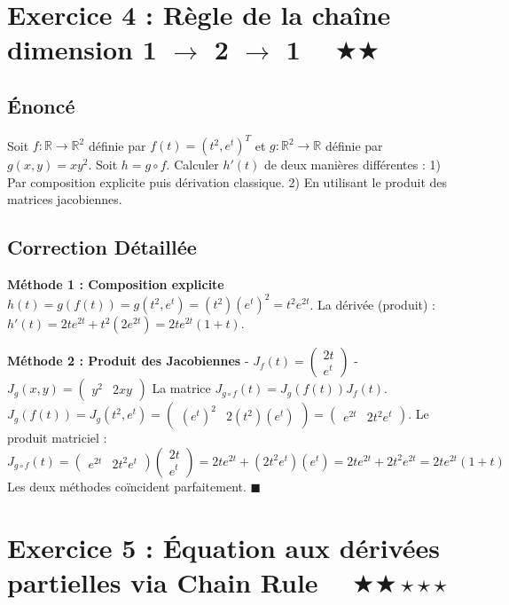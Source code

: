 \documentclass[11pt,a4paper]{article}
\begin{document}
\newpage
\section*{Exercice 4 : Règle de la chaîne dimension 1 $\to$ 2 $\to$ 1 $\quad \bigstar\bigstar$}
\subsection*{Énoncé}
Soit $f : \mathbb{R} \to \mathbb{R}^2$ définie par $f(t) = (t^2, e^t)^T$ et $g : \mathbb{R}^2 \to \mathbb{R}$ définie par $g(x,y) = x y^2$.
Soit $h = g \circ f$. Calculer $h'(t)$ de deux manières différentes :
1) Par composition explicite puis dérivation classique.
2) En utilisant le produit des matrices jacobiennes.
\subsection*{Correction Détaillée}
\textbf{Méthode 1 : Composition explicite}
$h(t) = g(f(t)) = g(t^2, e^t) = (t^2)(e^t)^2 = t^2 e^{2t}$.
La dérivée (produit) : $h'(t) = 2t e^{2t} + t^2(2e^{2t}) = 2t e^{2t}(1+t)$.

\textbf{Méthode 2 : Produit des Jacobiennes}
- $J_f(t) = \begin{pmatrix} 2t \\ e^t \end{pmatrix}$
- $J_g(x,y) = \begin{pmatrix} y^2 & 2xy \end{pmatrix}$
La matrice $J_{g \circ f}(t) = J_g(f(t)) J_f(t)$.
$J_g(f(t)) = J_g(t^2, e^t) = \begin{pmatrix} (e^t)^2 & 2(t^2)(e^t) \end{pmatrix} = \begin{pmatrix} e^{2t} & 2t^2 e^t \end{pmatrix}$.
Le produit matriciel :
$$ J_{g \circ f}(t) = \begin{pmatrix} e^{2t} & 2t^2 e^t \end{pmatrix} \begin{pmatrix} 2t \\ e^t \end{pmatrix} = 2t e^{2t} + (2t^2 e^t)(e^t) = 2te^{2t} + 2t^2e^{2t} = 2t e^{2t}(1+t) $$
Les deux méthodes coïncident parfaitement.
$\blacksquare$

\newpage
\section*{Exercice 5 : Équation aux dérivées partielles via Chain Rule $\quad \bigstar\bigstar\star\star\star$}
\end{document}
